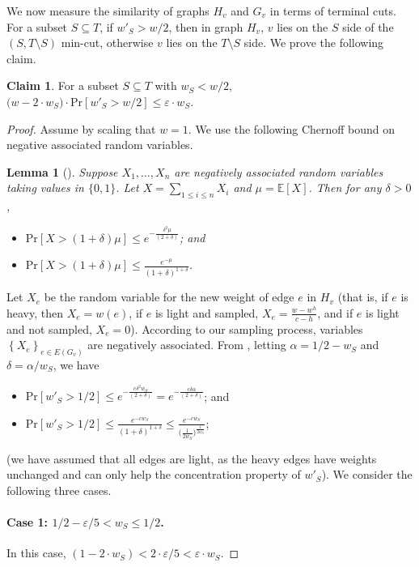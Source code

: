 \documentclass[11pt]{article}
\newtheorem{lemma}[theorem]{Lemma}
\theoremstyle{definition}
\newtheorem{claim}[theorem]{Claim}
\newcommand{\set}[1]{\left\{ #1 \right\}}
\newcommand{\eps}{{\varepsilon}}
\def\pr#1{\mathrm{Pr}\left[ #1 \right]}
\def\ex#1{{\mathbb{E}}\left[ #1 \right]}
\begin{document}
We now measure the similarity of graphs $H_v$ and $G_v$ in terms of terminal cuts.
For a subset $S\subseteq T$, if $w'_S>w/2$, then in graph $H_v$, $v$ lies on the $S$ side of the $(S, T\setminus S)$ min-cut, otherwise $v$ lies on the $T\setminus S$ side. 
We prove the following claim.

\begin{claim}
\label{clm: difference in contribution}
For a subset $S\subseteq T$ with $w_S<w/2$, $\big(w-2\cdot w_S\big) \cdot \pr{w'_S>w/2} \le \eps \cdot w_S$.
\end{claim}
\begin{proof}
Assume by scaling that $w=1$.
We use the following Chernoff bound on negative associated random variables.
	
    \begin{lemma} [\cite{dubhashi1996balls}] \label{chernoff}
		Suppose $X_1,\dots,X_n$ are negatively associated random variables taking values in $\{0,1\}$. Let $X=\sum_{1\le  i\le n}X_i$ and $\mu=\ex{X}$. Then for any $\delta>0$,
		\begin{itemize}
			\item $\pr{X > (1+\delta)\mu} \le e^{-\frac{\delta^2 \mu}{(2+\delta)}}$; and
			\item $\pr{X > (1+\delta)\mu} \le \frac{e^{-\mu}}{(1+\delta)^{1+\delta}}$.
		\end{itemize}
	\end{lemma}
Let $X_e$ be the random variable for the new weight of edge $e$ in $H_v$ (that is, if $e$ is heavy, then $X_e=w(e)$, if $e$ is light and sampled, $X_e=\frac{w-w^h}{c-h}$, and if $e$ is light and not sampled, $X_e=0$). According to our sampling process, variables $\set{X_e}_{e\in E(G_v)}$ are negatively associated.
From , letting $\alpha = 1/2 - w_S$ and $\delta = \alpha/w_S$, we have
\begin{itemize}
		\item $\pr{w'_S > 1/2} \le e^{-\frac{c \delta^2 w_S}{(2+\delta)}} = e^{-\frac{c \delta \alpha }{(2+\delta)}}$; and
		\item $\pr{w'_S > 1/2} \le \frac{e^{-c w_S}}{(1+\delta)^{1+\delta}} \le \frac{e^{-c w_S}}{\big(\frac{1}{2w_S}\big)^{\frac{1}{2w_S}}}$;
	\end{itemize}
(we have assumed that all edges are light, as the heavy edges have weights unchanged and can only help the concentration property of $w'_S$).
We consider the following three cases. 
\paragraph{Case 1: $1/2 - \eps/5 < w_S \le 1/2$.} In this case, $(1-2\cdot w_S)<2\cdot\eps/5<\eps\cdot w_S$.

\end{proof}
\end{document}
